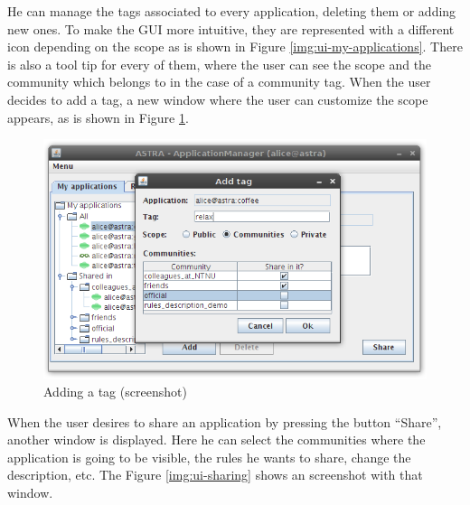 He can manage the tags associated to every application, deleting them or adding
new ones. To make the GUI more intuitive, they are represented with a different
icon depending on the scope as is shown in Figure \ref{img:ui-my-applications}.
There is also a tool tip for every of them, where the user can see the scope
and the community which belongs to in the case of a community tag.
\newline
When the user decides to add a tag, a new window where the user can customize
the scope appears, as is shown in Figure \ref{img:ui-adding-tags}.

\begin{figure}[h!]
 \begin{center}
 \includegraphics[scale=0.6]{screenshots/ui-adding-tags.png}
  \caption{\label{img:ui-adding-tags}Adding a tag (screenshot)}
 \end{center}
\end{figure}

When the user desires to share an application by pressing the button ``Share'',
another window is displayed. Here he can select the communities where the
application is going to be visible, the rules he wants to share, change the
description, etc. The Figure \ref{img:ui-sharing} shows an screenshot with
that window.


